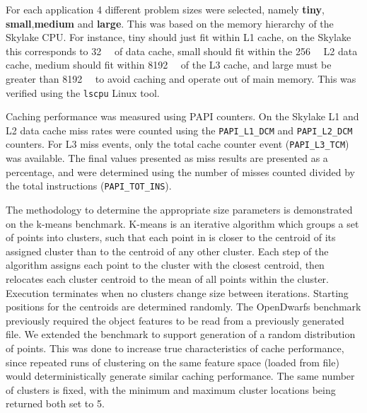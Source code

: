 \documentclass[../document.tex]{subfiles}
\begin{document}
\label{ssec:setting_sizes}

For each application 4 different problem sizes were selected, namely {\bf tiny}, {\bf small},{\bf medium} and {\bf large}.
This was based on the memory hierarchy of the Skylake CPU.
For instance, tiny should just fit within L1 cache, on the Skylake this corresponds to \SI{32}{\kibi\byte} of data cache, small should fit within the \SI{256}{\kibi\byte} L2 data cache, medium should fit within \SI{8192}{\kibi\byte} of the L3 cache, and large must be greater than \SI{8192}{\kibi\byte} to avoid caching and operate out of main memory.
This was verified using the {\tt lscpu} Linux tool.

Caching performance was measured using PAPI counters.
On the Skylake L1 and L2 data cache miss rates were counted using the {\tt PAPI\_L1\_DCM} and {\tt PAPI\_L2\_DCM} counters.
For L3 miss events, only the total cache counter event ({\tt PAPI\_L3\_TCM}) was available.
The final values presented as miss results are presented as a percentage, and were determined using the number of misses counted divided by the total instructions ({\tt PAPI\_TOT\_INS}).

The methodology to determine the appropriate size parameters is demonstrated on the k-means benchmark.
K-means is an iterative algorithm which groups a set of points into clusters, such that each point in is closer to the centroid of its assigned cluster than to the centroid of any other cluster.
Each step of the algorithm assigns each point to the cluster with the closest centroid, then relocates each cluster centroid to the mean of all points within the cluster.
Execution terminates when no clusters change size between iterations.
Starting positions for the centroids are determined randomly.
The OpenDwarfs benchmark previously required the object features to be read from a previously generated file.
We extended the benchmark to support generation of a random distribution of points.
This was done to increase true characteristics of cache performance, since repeated runs of clustering on the same feature space (loaded from file) would deterministically generate similar caching performance.
The same number of clusters is fixed, with the minimum and maximum cluster locations being returned both set to 5.
\end{document}
